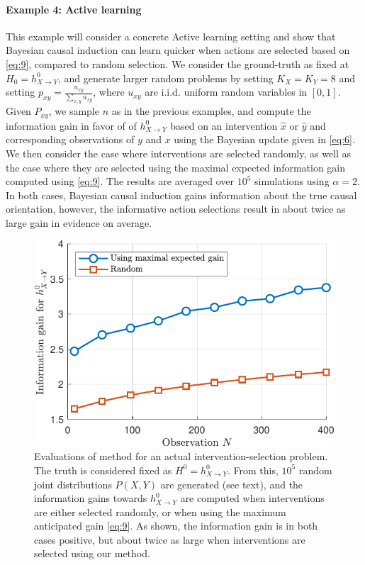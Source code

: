 \documentclass[letterpaper]{article} %
\begin{document}
\paragraph{Example 4: Active learning}
This example will consider a concrete Active learning setting and show that Bayesian causal induction can learn quicker when actions are selected based on \cref{eq:9}, compared to random selection. We consider the ground-truth as fixed at $H_0 = h^0_{X \rightarrow Y}$, and generate larger random problems by setting $K_X = K_Y  =8$ and setting $p_{xy} = \frac{u_{xy}}{\sum_{x,y} u_{xy}}$, where $u_{xy}$ are i.i.d. uniform random variables in $[0,1]$. Given $P_{xy}$, we sample $n$ as in the previous examples, and compute the information gain in favor of of $h^0_{X\rightarrow Y}$ based on an intervention $\hat x$ or $\hat y$ and corresponding observations of $y$ and $x$ using the Bayesian update given in \cref{eq:6}. We then consider the case where interventions are selected randomly, 
as well as the case where
 they are selected using the maximal expected information gain computed using \cref{eq:9}. The results are averaged over $10^5$ simulations using $\alpha=2$. In both cases, Bayesian causal induction gains information about the true causal orientation, however, the informative action selections result in about twice as large gain in evidence on average. 




\begin{figure}[t!]
	\centering
	\includegraphics[width=.8\linewidth]{fig4xy-crop}
	\caption{Evaluations of method for an actual intervention-selection problem. The truth is considered fixed as $H^0 = h^0_{X \rightarrow Y}$. From this, $10^5$ random joint distributions $P(X,Y)$ are generated (see text), and the information gains towards $h^0_{X \rightarrow Y}$ are computed when interventions are either selected randomly, or when using the maximum anticipated gain \cref{eq:9}. As shown, the information gain is in both cases positive, but about twice as large when interventions are selected using our method. }\label{fig5}
\end{figure}
\end{document}
